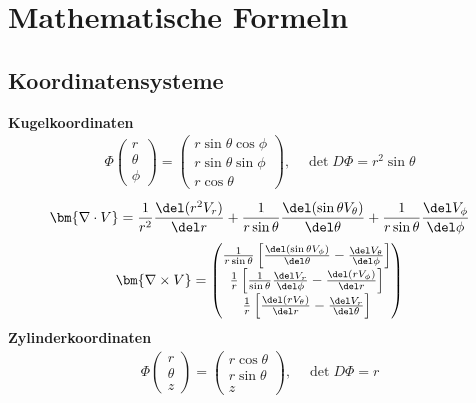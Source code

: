 \section{Mathematische Formeln}

\subsection{Koordinatensysteme}

\textbf{Kugelkoordinaten}
\begin{align*}
    \Phi \begin{pmatrix}
        r\\ \theta \\\phi
    \end{pmatrix} = \begin{pmatrix}
        r \sin \theta \cos \phi\\
        r \sin \theta \sin \phi\\
        r \cos \theta
    \end{pmatrix}, \quad \det D \Phi = r^2 \sin \theta
\end{align*}
\begin{align*}
    \bm{\nabla \cdot V} = \frac{1}{r^2} \frac{{\del}(r^2V_r)}{\del r} + \frac{1}{r \sin \theta} \frac{\del(\sin \theta V_{\theta})}{\del \theta} + \frac{1}{r\sin \theta} \frac{\del V_{\phi}}{\del \phi}
\end{align*}
\begin{align*}
    \bm{\nabla \times V} = \begin{pmatrix}
        \frac{1}{r \sin \theta} \left[\frac{\del(\sin \theta V_\phi)}{\del \theta} - \frac{\del V_{\theta}}{\del\phi}\right]\\
        \frac{1}{r} \left[\frac{1}{\sin \theta} \frac{\del V_r}{\del\phi} - \frac{\del(r V_\phi)}{\del r}\right]\\
        \frac{1}{r} \left[\frac{\del(r V_\theta)}{\del r} - \frac{\del V_r}{\del \theta}\right]
    \end{pmatrix}
\end{align*}
\textbf{Zylinderkoordinaten}
\begin{align*}
    \Phi \begin{pmatrix}
        r\\ \theta \\ z
    \end{pmatrix}
    = \begin{pmatrix}
        r \cos \theta\\
        r \sin \theta\\
        z
    \end{pmatrix}, \quad \det D \Phi =  r 
\end{align*}
